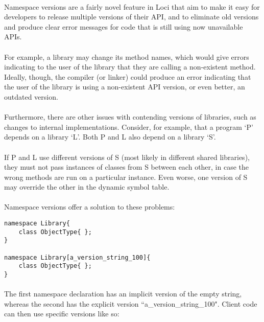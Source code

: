 \documentclass[12pt,twoside,notitlepage]{report}
\begin{document}
\paragraph{}
Namespace versions are a fairly novel feature in Loci that aim to make it easy for developers to release multiple versions of their API, and to eliminate old versions and produce clear error messages for code that is still using now unavailable APIs.

\paragraph{}
For example, a library may change its method names, which would give errors indicating to the user of the library that they are calling a non-existent method. Ideally, though, the compiler (or linker) could produce an error indicating that the user of the library is using a non-existent API version, or even better, an outdated version.

\paragraph{}
Furthermore, there are other issues with contending versions of libraries, such as changes to internal implementations. Consider, for example, that a program `P' depends on a library `L'. Both P and L also depend on a library `S'.

\paragraph{}
If P and L use different versions of S (most likely in different shared libraries), they must not pass instances of classes from S between each other, in case the wrong methods are run on a particular instance. Even worse, one version of S may override the other in the dynamic symbol table.

\paragraph{}
Namespace versions offer a solution to these problems:

\begin{lstlisting}
namespace Library{
	class ObjectType{ };
}

namespace Library[a_version_string_100]{
	class ObjectType{ };
}
\end{lstlisting}

\paragraph{}
The first namespace declaration has an implicit version of the empty string, whereas the second has the explicit version ``a\_version\_string\_100". Client code can then use specific versions like so:
\end{document}
